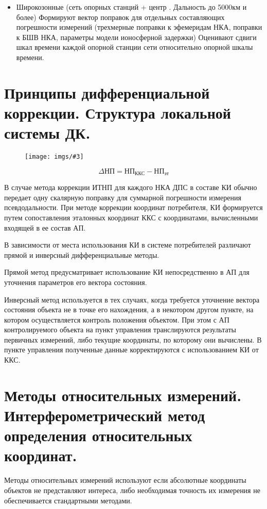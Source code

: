 \documentclass[14pt,a4paper,oneside]{extarticle}
\newcommand{\pic}[3]{
	\begin{figure}[#1]
		\begin{center}
			\texttt{[image: imgs/\#3]}
		\end{center}
	\end{figure}
}
\begin{document}
\begin{enumerate}
\begin{itemize}
              \item Широкозонные (сеть опорных станций + центр . Дальность до 5000км и более) Формируют вектор поправок для отдельных составляющих погрешности измерений (трехмерные поправки к эфемеридам НКА, поправки к БШВ НКА, параметры модели ионосферной задержки) Оценивают сдвиги шкал времени каждой опорной станции сети относительно опорной шкалы времени.
          \end{itemize}
\end{enumerate}

\section{Принципы дифференциальной коррекции. Структура локальной системы ДК.}

\pic{H}{\textwidth}{8}

\[\Delta \text{НП} = \text{НП}_\text{ККС} - \text{НП}_\text{эт} \]

В случае метода коррекции ИТНП для каждого НКА ДПС в составе КИ обычно передает одну скалярную поправку для суммарной погрешности измерения псевдодальности. При методе коррекции координат потребителя, КИ формируется путем сопоставления эталонных координат ККС с координатами, вычисленными входящей в ее состав АП.

В зависимости от места использования КИ в системе потребителей различают прямой и инверсный дифференциальные методы.

Прямой метод предусматривает использование КИ непосредственно в АП для уточнения параметров его вектора состояния.

Инверсный метод используется в тех случаях, когда требуется уточнение вектора состояния объекта не в точке его нахождения, а в некотором другом пункте, на котором осуществляется контроль положения объектом. При этом с АП контролируемого объекта на пункт управления транслируются результаты первичных измерений, либо текущие координаты, по которому они вычислены. В пункте управления полученные данные корректируются с использованием КИ от ККС.

\section{Методы относительных измерений. Интерферометрический метод определения относительных координат.}

Методы относительных измерений используют если абсолютные координаты объектов не представляют интереса, либо необходимая точность их измерения не обеспечивается стандартными методами.
\end{document}
